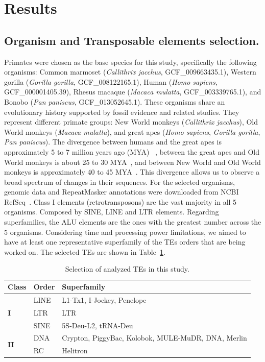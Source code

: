 \documentclass[unnumsec,webpdf,contemporary,large]{oup-authoring-template}%
\theoremstyle{thmstyleone}%
\theoremstyle{thmstyletwo}%
\theoremstyle{thmstylethree}%
\begin{document}
\section{Results}\label{sec3}

\subsection{Organism and Transposable elements selection.}\label{subsec3_1}

Primates were chosen as the base species for this study, specifically the
following organisms: Common marmoset (\textit{Callithrix jacchus},
GCF{\_}009663435.1), Western gorilla (\textit{Gorilla gorilla},
GCF{\_}008122165.1), Human (\textit{Homo sapiens}, GCF{\_}000001405.39), Rhesus
macaque (\textit{Macaca mulatta}, GCF{\_}003339765.1), and Bonobo (\textit{Pan
paniscus}, GCF{\_}013052645.1). These organisms share an evolutionary history
supported by fossil evidence and related studies. They represent different
primate groups: New World monkeys (\textit{Callithrix jacchus}), Old World
monkeys (\textit{Macaca mulatta}), and great apes (\textit{Homo sapiens},
\textit{Gorilla gorilla},\textit{ Pan paniscus}). The divergence between humans
and the great apes is approximately 5 to 7 million years ago (MYA)
~\cite{glazko_estimation_2003}, between the great apes and Old World monkeys is
about 25 to 30 MYA~\cite{stevens_palaeontological_2013}, and between New World
and Old World monkeys is approximately 40 to 45 MYA~\cite{pozzi_primate_2014}.
This divergence allows us to observe a broad spectrum of changes in their
sequences. For the selected organisms, genomic data and RepeatMasker annotations
were downloaded from NCBI RefSeq~\cite{oleary_reference_2016}. Class I elements
(retrotransposons) are the vast majority in all 5 organisms. Composed by SINE,
LINE and LTR elements. Regarding superfamilies, the ALU elements are the ones
with the greatest number across the 5 organisms. Considering time and processing
power limitations, we aimed to have at least one representative superfamily of
the TEs orders that are being worked on. The selected TEs are shown in
Table~\ref{table:tab2}. 

\begin{table}[!t]
\caption{Selection of analyzed TEs in this study.}\label{table:tab2}
\begin{tabularx}{\columnwidth}{@{} l l X @{}}
\toprule
\textbf{Class} & \textbf{Order} & \textbf{Superfamily} \\
\midrule
\multirow{3}{*}{\textbf{I}} & LINE & L1-Tx1, I-Jockey, Penelope \\
 & LTR & LTR \\
 & SINE & 5S-Deu-L2, tRNA-Deu \\
\multirow{2}{*}{\textbf{II}} & DNA & Crypton, PiggyBac, Kolobok, MULE-MuDR, DNA,
Merlin\\
 & RC & Helitron \\
\bottomrule
\end{tabularx}
\end{table}
\raggedbottom{}
\end{document}
